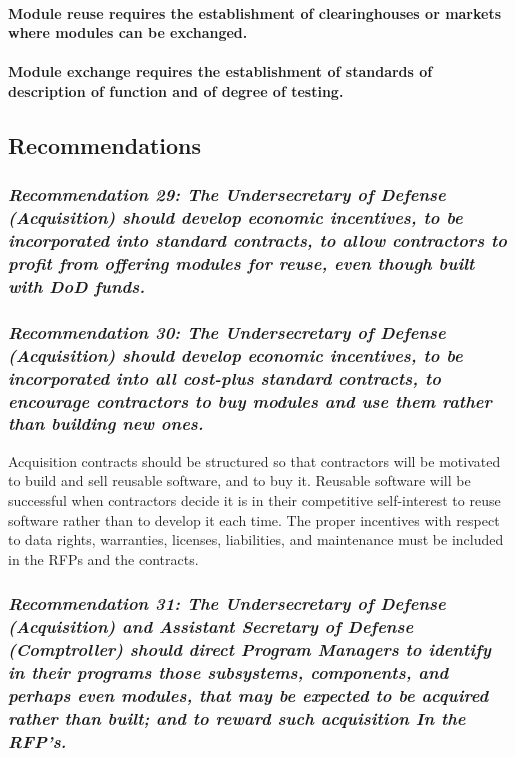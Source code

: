 \documentclass[11pt,final]{article}
\begin{document}
\paragraph{Module reuse requires the establishment of clearinghouses or markets where
modules can be exchanged.}

\paragraph{Module exchange requires the establishment of standards of description of
function and of degree of testing.}

\subsection*{Recommendations}

\label{rec:29}
\subsubsection*{\textit{Recommendation 29: The Undersecretary of Defense
(Acquisition) should develop economic incentives, to be incorporated into
standard contracts, to allow contractors to profit from offering modules for
reuse, even though built with DoD funds.}}

\label{rec:30}
\subsubsection*{\textit{Recommendation 30: The Undersecretary of Defense
(Acquisition) should develop economic incentives, to be incorporated into all
cost-plus standard contracts, to encourage contractors to buy modules and use
them rather than building new ones.}}

Acquisition contracts should be structured so that contractors will be
motivated to build and sell reusable software, and to buy it. Reusable software
will be successful when contractors decide it is in their competitive
self-interest to reuse software rather than to develop it each time. The proper
incentives with respect to data rights, warranties, licenses, liabilities, and
maintenance must be included in the RFPs and the contracts.

\label{rec:31}
\subsubsection*{\textit{Recommendation 31: The Undersecretary of Defense
(Acquisition) and Assistant Secretary of Defense (Comp\-troller) should direct
Program Managers to identify in their programs those subsystems, components,
and perhaps even modules, that may be expected to be acquired rather than
built; and to reward such acquisition In the RFP’s.}}
\end{document}
